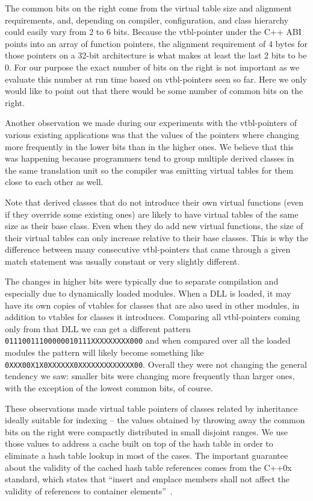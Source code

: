 \documentclass[preprint]{sigplanconf}
\begin{document}
The common bits on the right come from the virtual table size and alignment 
requirements, and, depending on compiler, configuration, and class hierarchy could 
easily vary from 2 to 6 bits. Because the vtbl-pointer under the C++ ABI points into 
an array of function pointers, the alignment requirement of 4 bytes for those 
pointers on a 32-bit architecture is what makes at least the last 2 bits to be 0. 
For our purpose the exact number of bits on the right is not important as we 
evaluate this number at run time based on vtbl-pointers seen so far. Here we only 
would like to point out that there would be some number of common bits on the 
right.

Another observation we made during our experiments with the vtbl-pointers of various 
existing applications was that the values of the pointers where changing more 
frequently in the lower bits than in the higher ones. We believe that this was 
happening because programmers tend to group multiple derived classes in the same 
translation unit so the compiler was emitting virtual tables for them close to 
each other as well. 

Note that derived classes that do not introduce their own virtual functions 
(even if they override some existing ones) are likely to have virtual tables of 
the same size as their base class. Even when they do add new virtual functions, 
the size of their virtual tables can only increase relative to their base 
classes. This is why the difference between many consecutive vtbl-pointers that 
came through a given match statement was usually constant or very slightly 
different.

The changes in higher bits were typically due to separate compilation and 
especially due to dynamically loaded modules. When a DLL is loaded, it may have 
its own copies of vtables for classes that are also used in other modules, in addition to 
vtables for classes it introduces. Comparing all vtbl-pointers coming only from 
that DLL we can get a different pattern \texttt{01110011100000010111XXXXXXXXX000} 
and when compared over all the loaded modules the pattern will likely become 
something like \texttt{0XXX00X1X0XXXXXX0XXXXXXXXXXXXX00}. Overall they were not 
changing the general tendency we saw: smaller bits were changing more frequently 
than larger ones, with the exception of the lowest common bits, of course.

These observations made virtual table pointers of classes related by inheritance 
ideally suitable for indexing -- the values obtained by throwing away the common 
bits on the right were compactly distributed in small disjoint ranges. We use 
those values to address a cache built on top of the hash table in order to 
eliminate a hash table lookup in most of the cases.  The important 
guarantee about the validity of the cached hash table references comes from the 
C++0x standard, which states that ``insert and emplace members shall not affect 
the validity of references to container elements''~\cite[.5(13)]{C++0x}. 
\end{document}
